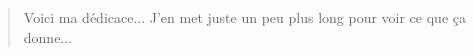 \thispagestyle{empty}


\begin{minipage}[l]{0.45\textwidth}

\end{minipage}%
\hfill
\begin{minipage}[r]{0.5\textwidth}
\begin{quotation}
\begin{doublespace}

Voici ma dédicace... J'en met juste un peu plus long pour voir ce que ça donne...

\end{doublespace}
\end{quotation}
\end{minipage}%

\cleardoublepage